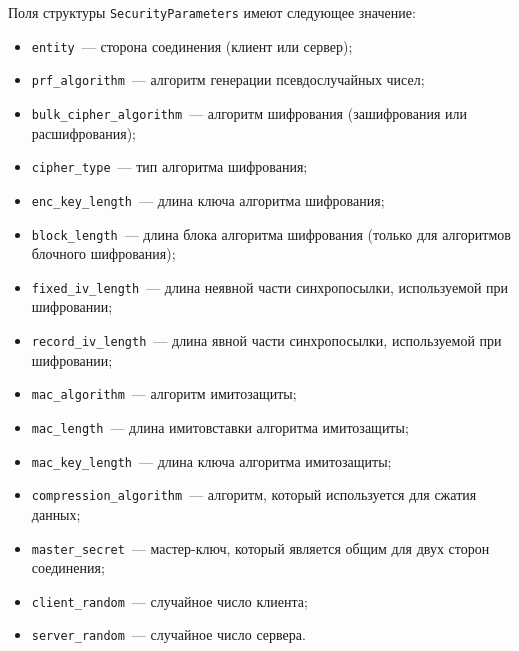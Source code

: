 Поля структуры \lstinline{SecurityParameters} имеют следующее значение:
\begin{itemize}
\item[--] 
\lstinline{entity}~--- сторона соединения (клиент или сервер);

\item[--]
\lstinline{prf_algorithm}~--- алгоритм генерации псевдослучайных чисел;

\item[--]
\lstinline{bulk_cipher_algorithm}~--- алгоритм шифрования (зашифрования 
или расшифрования); 

\item[--]
\lstinline{cipher_type}~--- тип алгоритма шифрования;

\item[--]
\lstinline{enc_key_length}~--- длина ключа алгоритма шифрования; 

\item[--]\lstinline{block_length}~--- длина блока алгоритма шифрования 
(только для алгоритмов блочного шифрования);

\item[--]\lstinline{fixed_iv_length}~--- длина неявной части 
синхропосылки, используемой при шифровании; 

\item[--]
\lstinline{record_iv_length}~--- длина явной части синхропосылки, 
используемой при шифровании; 

\item[--]
\lstinline{mac_algorithm}~--- алгоритм имитозащиты; 

\item[--]
\lstinline{mac_length}~--- длина имитовставки алгоритма имитозащиты;

\item[--]
\lstinline{mac_key_length}~--- длина ключа алгоритма имитозащиты;

\item[--]
\lstinline{compression_algorithm}~--- алгоритм, который используется для 
сжатия данных; 

\item[--]
\lstinline{master_secret}~--- мастер-ключ, который является общим для двух 
сторон соединения;  
 
\item[--]
\lstinline{client_random}~--- случайное число клиента;

\item[--]
\lstinline{server_random}~--- случайное число сервера.
\end{itemize}


